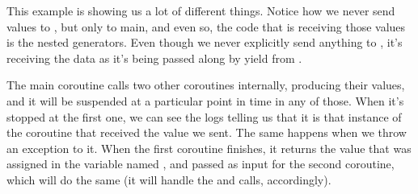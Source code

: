 \documentclass[a4paper,10pt,english]{sphinxmanual}
\begin{document}
\begin{sphinxVerbatim}[commandchars=\\\{\}]
  
\end{sphinxVerbatim}

This example is showing us a lot of different things. Notice how we never send values
to , but only to main, and even so, the code that is receiving those values is the
nested generators. Even though we never explicitly send anything to , it’s
receiving the data as it’s being passed along by yield from .

The main coroutine calls two other coroutines internally, producing their values, and it will
be suspended at a particular point in time in any of those. When it’s stopped at the first one,
we can see the logs telling us that it is that instance of the coroutine that received the value
we sent. The same happens when we throw an exception to it. When the first coroutine
finishes, it returns the value that was assigned in the variable named , and passed as
input for the second coroutine, which will do the same (it will handle the 
and  calls, accordingly).
\end{document}
